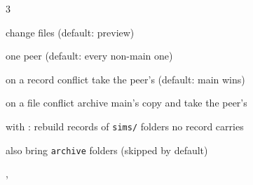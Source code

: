 \begin{multicols}{3}
\begin{flags}
\item {} change files (default: preview)
\item {} one peer (default: every non-main one)
\item {} on a record conflict take the peer's (default: main wins)
\item {} on a file conflict archive main's copy and take the peer's
\item {} with : rebuild records of \texttt{sims/} folders no record carries
\item {} also bring \texttt{archive} folders (skipped by default)
\item {}, 
\end{flags}


\end{multicols}

